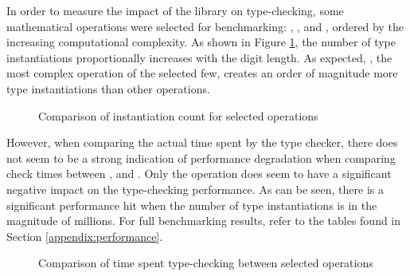 In order to measure the impact of the library on type-checking, some mathematical operations were selected for benchmarking: , ,  and , ordered by the increasing computational complexity. As shown in Figure \ref{fig:instantiation-count}, the number of type instantiations proportionally increases with the digit length. As expected, , the most complex operation of the selected few, creates an order of magnitude more type instantiations than other operations.

\pagebreak

\begin{figure}[ht]
  \centering
  \resizebox{\textwidth}{!}{}
  \caption{Comparison of instantiation count for selected operations}
  \label{fig:instantiation-count}
\end{figure}

However, when comparing the actual time spent by the type checker, there does not seem to be a strong indication of performance degradation when comparing check times between ,  and . Only the  operation does seem to have a significant negative impact on the type-checking performance. As can be seen, there is a significant performance hit when the number of type instantiations is in the magnitude of millions. For full benchmarking results, refer to the tables found in Section \ref{appendix:performance}.

\begin{figure}[ht]
  \centering
  \resizebox{\textwidth}{!}{}
  \caption{Comparison of time spent type-checking between selected operations}
  \label{fig:check-time}
\end{figure}

